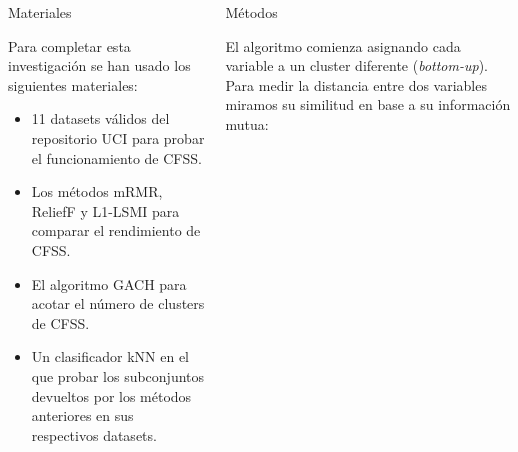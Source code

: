 \documentclass[final]{beamer}
\newlength{\onecolwid}
\newlength{\twocolwid}
\begin{document}
\begin{frame}[t]
\begin{columns}[t]
\begin{column}{\twocolwid} %

\begin{columns}[t,totalwidth=\twocolwid] %

\begin{column}{\onecolwid}\vspace{-.6in} %


\begin{block}{Materiales}

Para completar esta investigación se han usado los siguientes materiales:

\begin{itemize}
\item 11 datasets válidos del repositorio UCI para probar el funcionamiento de CFSS.
\item Los métodos mRMR, ReliefF y L1-LSMI para comparar el rendimiento de CFSS.
\item El algoritmo GACH para acotar el número de clusters de CFSS.
\item Un clasificador kNN en el que probar los subconjuntos devueltos por los métodos anteriores en sus respectivos datasets.
\end{itemize}

\end{block}


\end{column} %

\begin{column}{\onecolwid}\vspace{-.6in} %


\begin{block}{Métodos}

El algoritmo comienza asignando cada variable a un cluster diferente (\textit{bottom-up}). Para medir la distancia entre dos variables miramos su similitud en base a su información mutua:




\end{block}
\end{column}
\end{columns}
\end{column}
\end{columns}
\end{frame}
\end{document}

